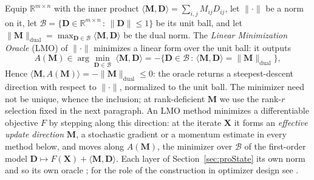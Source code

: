 \appendix
\section{}\label{app:prelim}


Equip $\mathbb{R}^{m\times n}$ with the inner product $\langle \mathbf{M},\mathbf{D}\rangle=\sum_{i,j}{M}_{ij}{D}_{ij}$, let $\|\cdot\|$ be a norm on it, let $\mathcal{B}=\{\mathbf{D}\in\mathbb{R}^{m\times n}\,:\,\|\mathbf{D}\|\le1\}$ be its unit ball, and let $\|\mathbf{M}\|_{\mathrm{dual}}=\max_{\mathbf{D}\in\mathcal{B}}\langle\mathbf{M},\mathbf{D}\rangle$ be the dual norm. The \emph{Linear Minimization Oracle} (LMO) of $\|\cdot\|$ minimizes a linear form over the unit ball: it outputs
\begin{equation}\label{eq:lmo_def}
A(\mathbf{M})\in\arg\min_{\mathbf{D}\in\mathcal{B}}\ \langle \mathbf{M}, \mathbf{D}\rangle=-\bigl\{\mathbf{D}\in\mathcal{B}\,:\,\langle\mathbf{M},\mathbf{D}\rangle=\|\mathbf{M}\|_{\mathrm{dual}}\bigr\},
\end{equation}
Hence $\langle\mathbf{M},A(\mathbf{M})\rangle=-\|\mathbf{M}\|_{\mathrm{dual}}\le0$: the oracle returns a steepest-descent direction with respect to $\|\cdot\|$, normalized to the unit ball. The minimizer need not be unique, whence the inclusion; at rank-deficient $\mathbf{M}$ we use the rank-$r$ selection fixed in the next paragraph. An LMO method minimizes a differentiable objective $F$ by stepping along this direction: at the iterate $\mathbf{X}$ it forms an \emph{effective update direction} $\mathbf{M}$, a stochastic gradient or a momentum estimate in every method below, and moves along $A(\mathbf{M})$, the minimizer over $\mathcal{B}$ of the first-order model $\mathbf{D}\mapsto F(\mathbf{X})+\langle\mathbf{M},\mathbf{D}\rangle$. Each layer of Section~\ref{sec:proState}  its own norm and so its own oracle \citep{riabinin2025gluon}; for the role of the construction in optimizer design see \citep{bernstein2024old,bernstein2025deriving,pethick2025training,kovalev2025understanding,riabinin2025gluon,cesista2025schattenp,kravatskiy2025kyfannorms}.

